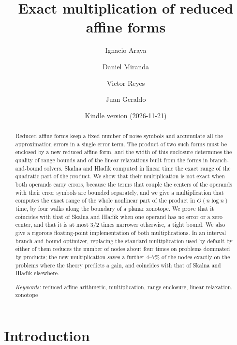 \documentclass[10pt]{article}
\title{Exact multiplication of reduced affine forms}
\author{Ignacio Araya \and Daniel Miranda \and Victor Reyes \and Juan Geraldo}
\date{\small Kindle version \DIFdelbegin \DIFdel{v8 }\DIFdelend \DIFaddbegin \DIFadd{v9 }\DIFaddend (2026-11-21)}
\theoremstyle{definition}
\begin{document}
\maketitle

\begin{abstract}
Reduced affine forms keep a fixed number of noise symbols and accumulate all the approximation errors in a single error term. The product of two such forms must be enclosed by a new reduced affine form, and the width of this enclosure determines the quality of range bounds and of the linear relaxations built from the forms in branch-and-bound solvers. Skalna and Hlad\'{\i}k computed in linear time the exact range of the quadratic part of the product. We show that their multiplication is not exact when both operands carry errors, because the terms that couple the centers of the operands with their error symbols are bounded separately, and we give a multiplication that computes the exact range of the whole nonlinear part of the product in $O(n\log n)$ time, by four walks along the boundary of a planar zonotope. We prove that it coincides with that of Skalna and Hlad\'{\i}k when one operand has no error or a zero center, and that it is at most $3/2$ times narrower otherwise, a tight bound. We also give a rigorous floating-point implementation of both multiplications. In an interval branch-and-bound optimizer, replacing the standard multiplication used by default by either of them reduces the number of nodes about four times on problems dominated by products; the new multiplication saves a further 4--7\% of the nodes exactly on the problems where the theory predicts a gain, and coincides with that of Skalna and Hlad\'{\i}k elsewhere.

\medskip\noindent
\textit{Keywords:} reduced affine arithmetic, multiplication, range enclosure, linear relaxation, zonotope
\end{abstract}

\section{Introduction}
\end{document}
